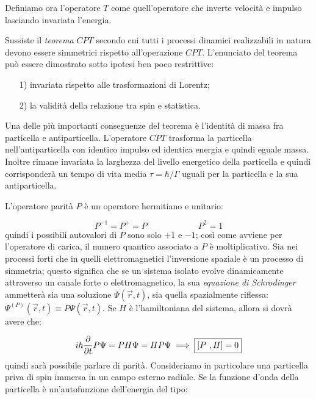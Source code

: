 Definiamo ora l'operatore $T$ come quell'operatore che inverte velocità e
impulso lasciando invariata l'energia.

Sussiste il \textit{teorema $CPT$} secondo cui tutti i processi dinamici
realizzabili in natura devono essere simmetrici rispetto all'operazione $CPT$.
L'enunciato del teorema può essere dimostrato sotto ipotesi ben poco
restrittive:

\begin{itemize}
\item[1)] invariata rispetto alle trasformazioni di Lorentz;
\item[2)] la validità della relazione tra spin e statistica. 
\end{itemize}

Una delle più importanti conseguenze del teorema è l'identità di massa fra
particella e antiparticella. L'operatore $CPT$ trasforma la particella
nell'antiparticella con identico impulso ed identica energia e quindi eguale
massa. Inoltre rimane invariata la larghezza del livello energetico della
particella e quindi corrisponderà un tempo di vita media $\tau = \hbar / 
\Gamma$
uguali per la particella e la sua antiparticella.

L'operatore parità $P$ è un operatore hermitiano e unitario:

\begin{equation*}
P^{-1} = P^+ = P \qquad \qquad \qquad P^2 = 1
\end{equation*}
quindi i possibili autovalori di $P$ sono solo $+1$ e $-1$; così come avviene
per l'operatore di carica, il numero quantico associato a $P$ è moltiplicativo.
Sia nei processi forti che in quelli elettromagnetici l'inversione spaziale è 
un
processo di simmetria; questo significa che se un sistema isolato	evolve
dinamicamente attraverso un canale forte o elettromagnetico, la sua
\textit{equazione di Schr$\ddot{o}$dinger} ammetterà sia una soluzione
$\Psi(\vec{r},t)$, sia quella spazialmente riflessa: $\Psi^{(P)} (\vec{r} , t)
\equiv P \Psi (\vec{r}, t)$. Se $H$ è l'hamiltoniana del sistema, allora si
dovrà avere che:

\begin{equation*}
i \hbar \dfrac{\partial}{\partial t} P \Psi = P H \Psi = H P \Psi \implies 
\fbox{$[P \ , H]=0$}
\end{equation*}
quindi sarà possibile parlare di parità. Consideriamo in particolare una
particella priva di spin immersa in un campo esterno radiale. Se la funzione
d'onda della particella è un'autofunzione dell'energia del tipo:

